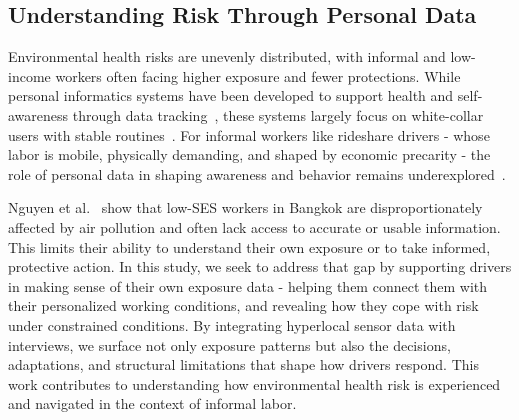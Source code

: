 


\subsection{Understanding Risk Through Personal Data}

Environmental health risks are unevenly distributed, with informal and low-income workers often facing higher exposure and fewer protections. 
While personal informatics systems have been developed to support health and self-awareness through data tracking~\cite{li2010stage}, these systems largely focus on white-collar users with stable routines~\cite{epstein2020}. 
For informal workers like rideshare drivers - whose labor is mobile, physically demanding, and shaped by economic precarity - the role of personal data in shaping awareness and behavior remains underexplored~\cite{slater2022air}.

Nguyen et al.~\cite{nguyen2023bangkokpollution} show that low-SES workers in Bangkok are disproportionately affected by air pollution and often lack access to accurate or usable information. 
This limits their ability to understand their own exposure or to take informed, protective action. 
In this study, we seek to address that gap by supporting drivers in making sense of their own exposure data - helping them connect them with their personalized working conditions, and revealing how they cope with risk under constrained conditions. 
By integrating hyperlocal sensor data with interviews, we surface not only exposure patterns but also the decisions, adaptations, and structural limitations that shape how drivers respond. 
This work contributes to understanding how environmental health risk is experienced and navigated in the context of informal labor.


